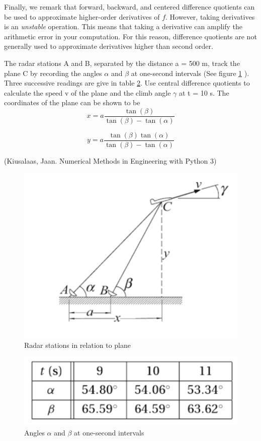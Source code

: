 Finally, we remark that forward, backward, and centered difference quotients can be used to approximate higher-order derivatives of $f$.
However, taking derivatives is an \emph{unstable} operation.
This means that taking a derivative can amplify the arithmetic error in your computation.
For this reason, difference quotients are not generally used  to approximate derivatives higher than second order.

\begin{problem}
The radar stations A and B, separated by the distance a = 500 m, track the plane C by recording the angles $\alpha$ and $\beta$ at one-second intervals (See figure \ref{plane} ). 
Three successive readings are give in table \ref{angles}.
Use central difference quotients to calculate the speed v of the plane and the climb angle $\gamma$ at t = 10 s. 
The coordinates of the plane can be shown to be
\begin{equation}
x = a \frac{\tan(\beta)}{\tan(\beta)-\tan(\alpha)}
\end{equation}

\begin{equation}
 y = a \frac{\tan(\beta)\tan(\alpha)}{\tan(\beta)-\tan(\alpha)}
\end{equation}


(Kiusalaas, Jaan. Numerical Methods in Engineering with Python 3)
\end{problem}

\begin{figure}
\includegraphics[width=.5\textwidth]{plane_diagram.png}
\caption{Radar stations in relation to plane}
\label{plane}
\end{figure}

\begin{figure}
\includegraphics[width=.5\textwidth]{angles_table.png}
\caption{Angles $\alpha$ and $\beta$ at one-second intervals}
\label{angles}
\end{figure}

